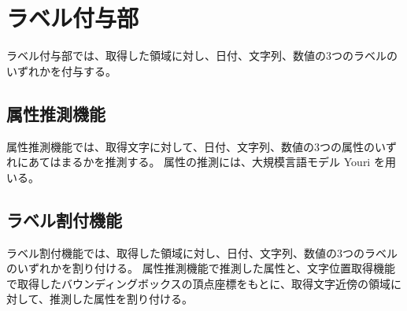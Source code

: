 \section{ラベル付与部}\label{sec:label_link_part}
ラベル付与部では、取得した領域に対し、日付、文字列、数値の3つのラベルのいずれかを付与する。


\subsection{属性推測機能}\label{subsec:att_prediction}
属性推測機能では、取得文字に対して、日付、文字列、数値の3つの属性のいずれにあてはまるかを推測する。
属性の推測には、大規模言語モデル Youri を用いる。

\subsection{ラベル割付機能}\label{subsec:label_link}
ラベル割付機能では、取得した領域に対し、日付、文字列、数値の3つのラベルのいずれかを割り付ける。
属性推測機能で推測した属性と、文字位置取得機能で取得したバウンディングボックスの頂点座標をもとに、取得文字近傍の領域に対して、推測した属性を割り付ける。
